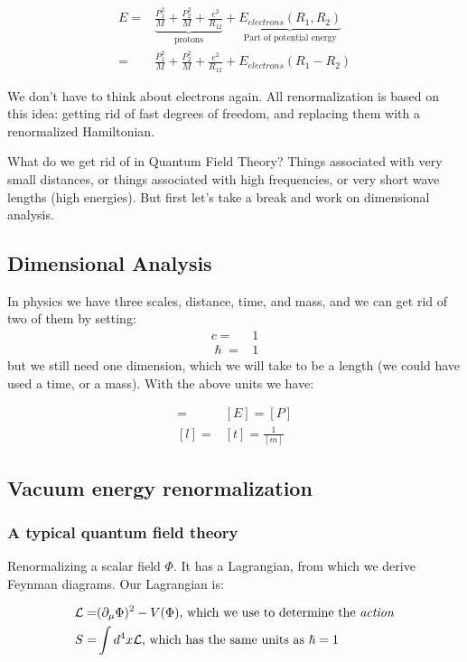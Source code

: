 \documentclass[]{article}
\begin{document}
\begin{align*}
	E=& \underbrace{\frac{P_1^2}{M} + \frac{P_2^2}{M} + \frac{e^2}{R_{12}}}_\text{protons} +\underbrace{ E_{electrons}(R_1,R_2)}_\text{Part of potential energy}\\
	=& \frac{P_1^2}{M} + \frac{P_2^2}{M} + \frac{e^2}{R_{12}}+ E_{electrons}(R_1-R_2)
\end{align*}

We don't have to think about electrons again. All renormalization is based on this idea: getting rid of fast degrees of freedom, and replacing them with a renormalized Hamiltonian. 

What do we get rid of in Quantum Field Theory? Things associated with very small distances, or things associated with high frequencies, or very short wave lengths (high energies). But first let's take a break and work on dimensional analysis.

\subsection{Dimensional Analysis}

In physics we have three scales, distance, time, and mass, and we can get rid of two of them by setting:
\begin{align*}
	c=&1\\
	\hslash=& 1
\end{align*} 
but we still need one dimension, which we will take to be a length (we could have used a time, or a mass). With the above units we have: 

\begin{align*}
	[m] =& [E]	= [P]\\
	[l] =& [t]	= \frac{1}{[m]}
\end{align*}

\subsection{Vacuum energy renormalization}
\subsubsection{A typical quantum field theory}

Renormalizing a scalar field $\Phi$. It has a Lagrangian, from which we derive Feynman diagrams. Our Lagrangian is:

\begin{align*}
	\mathcal{L} =& (\partial_\mu \Phi)^2 - V(\Phi) \text{, which we use to determine the \emph{action}}\\
	S =& \int d^4 x \mathcal{L} \text{, which has the same units as $\hslash=1$}
\end{align*}
\end{document}
